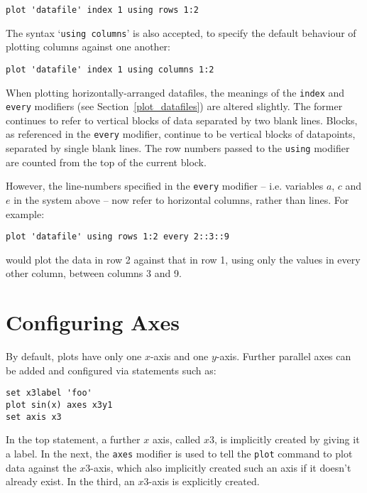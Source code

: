 \begin{verbatim}
plot 'datafile' index 1 using rows 1:2
\end{verbatim}

The syntax `\texttt{using columns}' is also accepted, to specify the default
behaviour of plotting columns against one another:

\begin{verbatim}
plot 'datafile' index 1 using columns 1:2
\end{verbatim}

When plotting horizontally-arranged datafiles, the meanings of the
\texttt{index} and \texttt{every} modifiers (see Section~\ref{plot_datafiles})
are altered slightly. The former continues to refer to vertical blocks of data
separated by two blank lines.  Blocks, as referenced in the \texttt{every}
modifier, continue to be vertical blocks of datapoints, separated by single
blank lines. The row numbers passed to the \texttt{using} modifier are counted
from the top of the current block.

However, the line-numbers specified in the \texttt{every} modifier -- i.e.
variables $a$, $c$ and $e$ in the system above -- now refer to horizontal
columns, rather than lines. For example:

\begin{verbatim}
plot 'datafile' using rows 1:2 every 2::3::9
\end{verbatim}

\noindent would plot the data in row 2 against that in row 1, using only the
values in every other column, between columns 3 and 9.


\section{Configuring Axes}
\label{axis_extensions}\label{ranges_multiaxes}\label{multiple_axes}

By default, plots have only one $x$-axis and one $y$-axis. Further parallel
axes can be added and configured via statements such as:

\begin{verbatim}
set x3label 'foo'
plot sin(x) axes x3y1
set axis x3
\end{verbatim}

\noindent In the top statement, a further $x$ axis, called $x3$, is implicitly
created by giving it a label. In the next, the \texttt{axes} modifier is used
to tell the \texttt{plot} command to plot data against the $x3$-axis, which
also implicitly created such an axis if it doesn't already exist. In the third,
an $x3$-axis is explicitly created.

